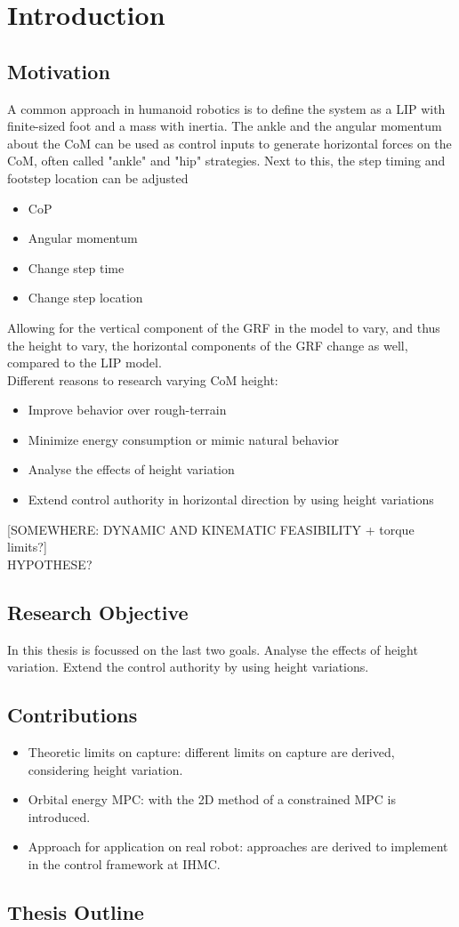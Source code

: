 %
\chapter{Introduction} \label{chap::intro}
\section{Motivation}
A common approach in humanoid robotics is to define the system as a \ac{LIP} with finite-sized foot and a mass with inertia. The ankle and the angular momentum about the \ac{CoM} can be used as control inputs to generate horizontal forces on the \ac{CoM}, often called "ankle" and "hip" strategies.  Next to this, the step timing and footstep location can be adjusted
\begin{itemize}
	\item \ac{CoP}
	\item Angular momentum
	\item Change step time
	\item Change step location
\end{itemize}

Allowing for the vertical component of the \ac{GRF} in the model to vary, and thus the height to vary, the horizontal components of the \ac{GRF} change as well, compared to the \ac{LIP} model.\\
Different reasons to research varying \ac{CoM} height: 
\begin{itemize}
	\item Improve behavior over rough-terrain
	\item Minimize energy consumption or mimic natural behavior
	\item Analyse the effects of height variation
	\item Extend control authority in horizontal direction by using height variations
\end{itemize}

[SOMEWHERE: DYNAMIC AND KINEMATIC FEASIBILITY + torque limits?]\\
HYPOTHESE?
\section{Research Objective}
In this thesis is focussed on the last two goals. Analyse the effects of height variation. Extend the control authority by using height variations. 

\section{Contributions}
\begin{itemize}
	\item Theoretic limits on capture: different limits on capture are derived, considering height variation.
	\item Orbital energy \ac{MPC}: with the \ac{2D} method of \cite{koolen2016balance} a constrained \ac{MPC} is introduced.
	\item Approach for application on real robot: approaches are derived to implement in the control framework at IHMC.
\end{itemize}
\section{Thesis Outline}


